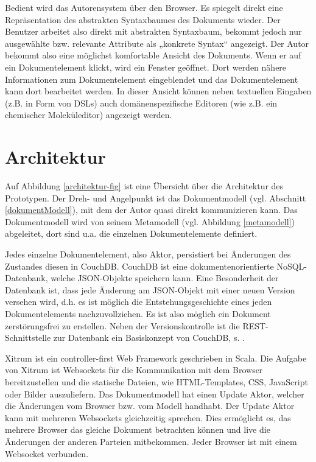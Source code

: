  
Bedient wird das Autorensystem über den Browser. Es spiegelt direkt eine Repräsentation des abstrakten Syntaxbaumes des Dokuments wieder. Der Benutzer arbeitet also direkt mit abstrakten Syntaxbaum, bekommt jedoch nur ausgewählte bzw. relevante Attribute als „konkrete Syntax“ angezeigt. Der Autor bekommt also eine möglichst komfortable Ansicht des Dokuments. Wenn er auf ein Dokumentelement klickt, wird ein Fenster geöffnet. Dort werden nähere Informationen zum Dokumentelement eingeblendet und das Dokumentelement kann dort bearbeitet werden. In dieser Ansicht können neben textuellen Eingaben (z.B. in Form von DSLs) auch domänenspezifische Editoren (wie z.B. ein chemischer Moleküleditor) angezeigt werden.

 
\section{Architektur}\label{}
 
Auf Abbildung \ref{architektur-fig} ist eine Übersicht über die Architektur des Prototypen. Der Dreh- und Angelpunkt ist das Dokumentmodell (vgl. Abschnitt \ref{dokumentModell}), mit dem der Autor quasi direkt kommunizieren kann. Das Dokumentmodell wird von seinem Metamodell (vgl. Abbildung \ref{metamodell}) abgeleitet, dort sind u.a. die einzelnen Dokumentelemente definiert.

 
Jedes einzelne Dokumentelement, also Aktor, persistiert bei Änderungen des Zustandes diesen in CouchDB. CouchDB ist eine dokumentenorientierte NoSQL-Datenbank, welche JSON-Objekte speichern kann. Eine Besonderheit der Datenbank ist, dass jede Änderung am JSON-Objekt mit einer neuen Version versehen wird, d.h. es ist möglich die Entstehungsgeschichte eines jeden Dokumentelements nachzuvollziehen. Es ist also möglich ein Dokument zerstörungsfrei zu erstellen. Neben der Versionskontrolle ist die REST-Schnittstelle zur Datenbank ein Basiskonzept von CouchDB, s. \citep{Anderson}.

 
Xitrum ist ein controller-first Web Framework geschrieben in Scala. Die Aufgabe von Xitrum ist Websockets für die Kommunikation mit dem Browser bereitzustellen und die statische Dateien, wie HTML-Templates, CSS, JavaScript oder Bilder auszuliefern. Das Dokumentmodell hat einen Update Aktor, welcher die Änderungen vom Browser bzw. vom Modell handhabt. Der Update Aktor kann mit mehreren Websockets gleichzeitig sprechen. Dies ermöglicht es, das mehrere Browser das gleiche Dokument betrachten können und live die Änderungen der anderen Parteien mitbekommen. Jeder Browser ist mit einem Websocket verbunden.

